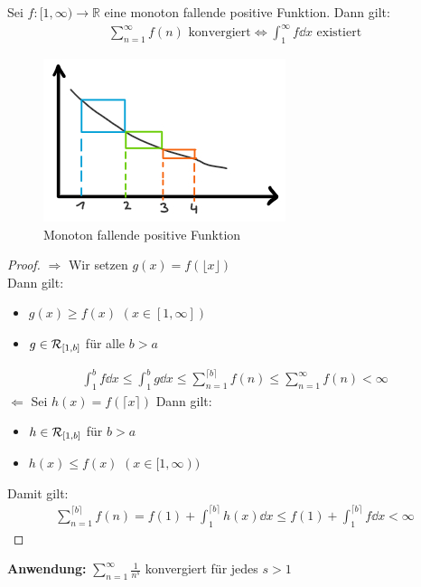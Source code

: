 \begin{Satz}{
	Sei $f : [1, \infty) \rightarrow \mathbb{R}$ eine monoton fallende 
	positive Funktion. 
	Dann gilt:
	\begin{align*}
		\sum_{n = 1}^{\infty} f(n) \text{ konvergiert} \Leftrightarrow 
		\int_1^{\infty} f \dd{x} \text{ existiert}
	\end{align*}
	\begin{figure}
	\centering
		\caption{Monoton fallende positive Funktion}
		\includegraphics[scale=0.9]{Skizzen/plot_monotone_fkt_integral}
	\end{figure}
}\end{Satz}

\begin{proof}
	$\Rightarrow$ Wir setzen $g(x) = f( \lfloor x \rfloor )$ \\
	Dann gilt:
	\begin{itemize}
		\item $g(x) \geq f(x)$ $(x \in [1, \infty])$
		\item $g \in \mathcal{R}_{[{1},{b}]}$ für alle $ b > a$
	\end{itemize}
	\begin{align*}
		\int_1^b f \dd{x} \leq \int_1^b g \dd{x} \leq \sum_{n = 1}^{\lceil b \rceil}
		f(n) \leq \sum_{n=1}^{\infty} f(n) < \infty 
	\end{align*}
	$\Leftarrow$ Sei $ h(x) = f(\lceil x \rceil )$ Dann gilt:
	\begin{itemize}
		\item $h \in \mathcal{R}_{[{1},{b}]} $ für $b >a$
		\item $h(x) \leq f(x) $ $ (x \in [1, \infty)) $
	\end{itemize}
	Damit gilt:
	\begin{align*}
		\sum_{n = 1}^{\lceil b \rceil }f(n) = f(1) + 
		\int_1^{\lceil b \rceil}h(x) \dd{x} 
		\leq f(1) + \int_1^{\lceil b \rceil} f \dd{x} < \infty
	\end{align*}
\end{proof}

\textbf{Anwendung:} $\sum_{n=1}^{\infty}\frac{1}{n^s}$ konvergiert für jedes $s > 1$

